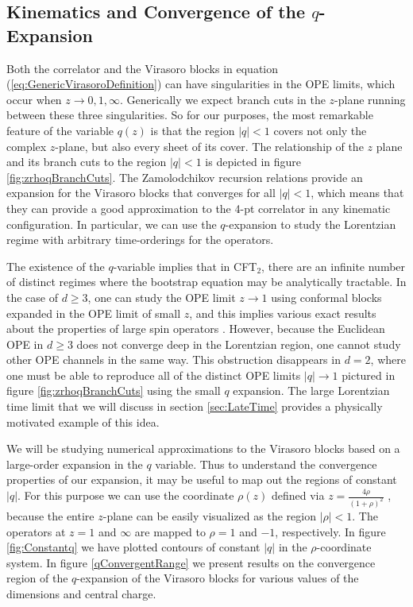 \documentclass[12pt]{article}
\numberwithin{equation}{section}
\begin{document}
\subsection{Kinematics and Convergence of the $q$-Expansion}
\label{sec:Kinematicsandq}

Both the correlator and the Virasoro blocks in equation (\ref{eq:GenericVirasoroDefinition}) can have singularities in the OPE limits, which occur when $z \to 0, 1, \infty$.  Generically we expect branch cuts in the $z$-plane running between these three singularities.  So for our purposes, the most remarkable feature of the variable $q(z)$ is that the region $|q| < 1$ covers not only the complex $z$-plane, but also every sheet of its cover. The relationship of the $z$ plane and its branch cuts to the region $|q| < 1$  \cite{Maldacena:2015iua} is depicted in figure \ref{fig:zrhoqBranchCuts}.  The Zamolodchikov recursion relations provide an expansion for the Virasoro blocks that converges for all $|q| < 1$, which means that they can provide a good approximation to the 4-pt correlator in any kinematic configuration.  In particular, we can use the $q$-expansion to study the Lorentzian regime with arbitrary time-orderings for the operators.

The existence of the $q$-variable implies that in CFT$_2$, there are an infinite number of distinct regimes where the bootstrap equation may be analytically tractable.  In the case of $d \geq 3$, one can study the OPE limit $z \to 1$ using conformal blocks expanded in the OPE limit of small $z$, and this implies various exact results about the properties of large spin operators \cite{Fitzpatrick:2012yx, KomargodskiZhiboedov, Alday:2016njk}.  However, because the Euclidean OPE in $d \geq 3$ does not converge deep in the Lorentzian region, one cannot study other OPE channels in the same way.  This obstruction disappears in $d =2$, where one must be able to reproduce all of the distinct OPE limits $|q| \to 1$ pictured in figure \ref{fig:zrhoqBranchCuts} using the small $q$ expansion.   The large Lorentzian time limit that we will discuss in section \ref{sec:LateTime} provides a physically motivated example of this idea.

We will be studying numerical approximations to the Virasoro blocks based on a large-order expansion in the $q$ variable.  Thus to understand the convergence properties of our expansion, it may be useful to map out the regions of constant $|q|$.  For this purpose we can use the coordinate $\rho(z)$ defined via $z = \frac{4 \rho}{(1+\rho)^2}$ \cite{Pappadopulo:2012jk}, because the entire $z$-plane can be easily visualized as the region $|\rho| < 1$.  The operators at $z= 1$ and $\infty$ are mapped to $\rho = 1$ and  $-1$, respectively.  In figure \ref{fig:Constantq} we have plotted contours of constant $|q|$ in the $\rho$-coordinate system.  In figure \ref{qConvergentRange} we present results on the convergence region of the $q$-expansion of the Virasoro blocks for various values of the dimensions and central charge.
\end{document}
